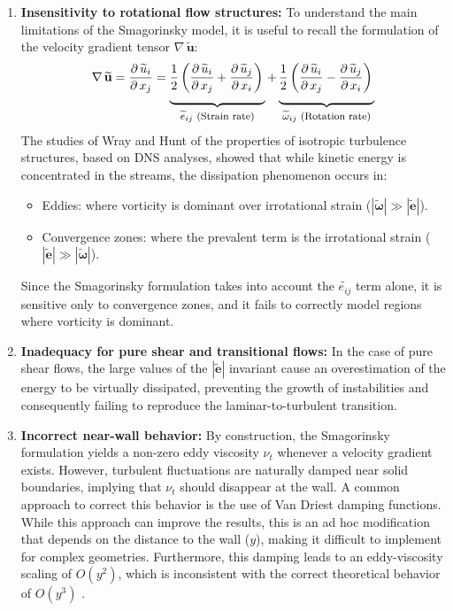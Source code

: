 \documentclass[12pt, a4paper, twoside, openright]{book}
\begin{document}
\begin{enumerate}
	\item \textbf{Insensitivity to rotational flow structures:} To understand the main limitations of the Smagorinsky model, it is useful to recall the formulation of the velocity gradient tensor $\nabla \, \widetilde{\bm{u}}$:
	      \begin{equation}
		      \nabla \, \widetilde{\mathbf{u}} = \frac{\partial \, \widetilde{u}_i}{\partial \, x_j} =
		      \underbrace{ \frac{1}{2} \left( \frac{\partial \, \widetilde{u}_i}{\partial \, x_j} + \frac{\partial \, \widetilde{u}_j}{\partial \,x_i} \right) \rule[-15pt]{0pt}{0pt} }_{\text{\footnotesize $\widetilde{e}_{ij}$ (Strain rate)}}
		      +
		      \underbrace{ \frac{1}{2} \left( \frac{\partial \, \widetilde{u}_i}{\partial \, x_j} - \frac{\partial \, \widetilde{u}_j}{\partial \,x_i} \right) \rule[-15pt]{0pt}{0pt} }_{\text{\footnotesize $\widetilde{\omega}_{ij}$ (Rotation rate)}}
	      \end{equation}
	      The studies of Wray and Hunt \cite{wray-hunt} of the properties of isotropic turbulence structures, based on DNS analyses, showed that while kinetic energy is concentrated in the streams, the dissipation phenomenon occurs in:
	      \begin{itemize}
		      \item Eddies: where vorticity is dominant over irrotational strain ($|\bm{\widetilde{\omega}}| \gg |\bm{\widetilde{e}}|$).
		      \item Convergence zones: where the prevalent term is the irrotational strain ($|\bm{\widetilde{e}}| \gg |\bm{\widetilde{\omega}}|$).
	      \end{itemize}
	      Since the Smagorinsky formulation takes into account the $\widetilde{e_{ij}}$ term alone, it is sensitive only to convergence zones, and it fails to correctly model regions where vorticity is dominant.

	\item \textbf{Inadequacy for pure shear and transitional flows: } In the case of pure shear flows, the large values of the $|\bm{\widetilde{e}}|$ invariant cause an overestimation of the energy to be virtually dissipated, preventing the growth of instabilities and consequently failing to reproduce the laminar-to-turbulent transition.

	\item \textbf{Incorrect near-wall behavior:} By construction, the Smagorinsky formulation yields a non-zero eddy viscosity $\nu_t$ whenever a velocity gradient exists. However, turbulent fluctuations are naturally damped near solid boundaries, implying that $\nu_t$ should disappear at the wall. A common approach to correct this behavior is the use of Van Driest damping functions. While this approach can improve the results, this is an ad hoc modification that depends on the distance to the wall ($y$), making it difficult to implement for complex geometries. Furthermore, this damping leads to an eddy-viscosity scaling of $O(y^2)$, which is inconsistent with the correct theoretical behavior of $O(y^3)$ \cite{wale}.
\end{enumerate}
\end{document}
